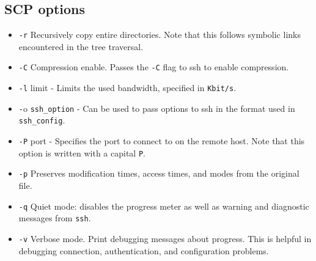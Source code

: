 \subsection{SCP options}
\begin{itemize}
\item \verb+-r+ Recursively copy entire directories. Note that this follows symbolic links encountered in the tree traversal.
\item \verb+-C+ Compression enable. Passes the \verb+-C+ flag to ssh to enable compression.
\item \verb+-l+ limit - Limits the used bandwidth, specified in \verb+Kbit/s+.
\item \verb+-+o \verb+ssh_option+ - Can be used to pass options to ssh in the format used in \verb+ssh_config+.
\item \verb+-P+ port - Specifies the port to connect to on the remote host. Note that this option is written with a capital \verb+P+.
\item \verb+-p+ Preserves modification times, access times, and modes from the original file.
\item \verb+-q+ Quiet mode: disables the progress meter as well as warning and diagnostic messages from \verb+ssh+.
\item \verb+-v+ Verbose mode. Print debugging messages about progress. 
This is helpful in debugging connection, authentication, and configuration problems.
\end{itemize}

